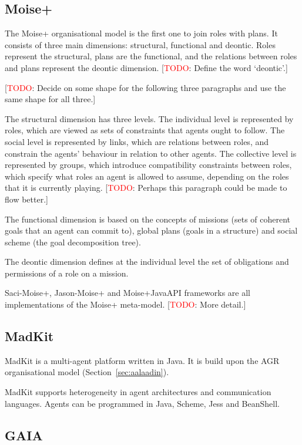 \documentclass{article}
\newcommand{\todo}[1]{[\textcolor{red}{TODO}: #1]}
\begin{document}
\subsection{Moise+} 

The Moise+ organisational model is the first one to join roles
with plans. It consists of three main dimensions: structural,
functional and deontic. Roles represent the structural, plans
are the functional, and the relations between roles and
plans represent the deontic dimension. \todo{Define the word
`deontic'.}

\todo{Decide on some shape for the following three paragraphs
and use the same shape for all three.}

The structural dimension has three levels. The individual level
is represented by roles, which are viewed as sets of constraints
that agents ought to follow. The social level is represented
by links, which are relations between roles, and constrain the
agents' behaviour in relation to other agents. The collective
level is represented by groups, which introduce compatibility
constraints between roles, which specify what roles an agent is
allowed to assume, depending on the roles that it is currently
playing. \todo{Perhaps this paragraph could be made to flow
better.}

The functional dimension is based on the concepts of missions
(sets of coherent goals that an agent can commit to), global
plans (goals in a structure) and social scheme (the goal
decomposition tree). 

The deontic dimension defines at the individual level the set of
obligations and permissions of a role on a mission.

Saci-Moise+, Jason-Moise+ and Moise+JavaAPI frameworks are all
implementations of the Moise+ meta-model. \todo{More detail.}

\subsection{MadKit} 

MadKit is a multi-agent platform written in Java. It is build upon
the AGR organisational model (Section~\ref{sec:aalaadin}).

MadKit supports heterogeneity in agent architectures and
communication languages. Agents can be programmed in Java,
Scheme, Jess and BeanShell.

\subsection{GAIA}
\end{document}
